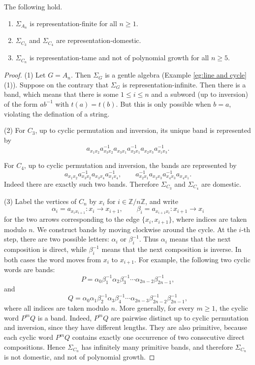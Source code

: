 \documentclass[a4paper,leqno]{amsart}
\begin{document}
\begin{prop}\label{prop:biserial rep type}
The following hold.
\begin{enumerate}
    \item $\Sigma_{A_n}$ is representation-finite for all $n\ge 1$.
    \item $\Sigma_{C_3}$ and $\Sigma_{C_4}$ are representation-domestic.
    \item $\Sigma_{C_n}$ is representation-tame and not of polynomial growth for all $n\geq 5$.
\end{enumerate}
\end{prop}
\begin{proof}
(1) Let $G=A_n$. Then $\Sigma_G$ is a gentle algebra (Example \ref{eg:line and cycle} (1)).  Suppose on the contrary that $\Sigma_G$ is representation-infinite.  Then there is a band, which means that there is some $1\le i\le n$ and a subword (up to inversion) of the form $ab^{-1}$ with $t(a)=t(b)$.  But this is only possible when $b=a$, violating the defination of a string.

(2)  %
For $C_3$, up to cyclic permutation and inversion, its unique band is represented by
$$a_{x_1x_2}a_{x_3x_2}^{-1}a_{x_3x_1}a_{x_2x_1}^{-1}a_{x_2x_3}a_{x_1x_3}^{-1}.$$

For $C_4$, up to cyclic permutation and inversion, the bands are represented by
$$a_{x_1x_2}a_{x_3x_2}^{-1}a_{x_3x_4}a_{x_1x_4}^{-1},\qquad a_{x_2x_1}^{-1}a_{x_2x_3}a_{x_4x_3}^{-1}a_{x_4x_1}.$$
Indeed there are exactly such two bands. Therefore $\Sigma_{C_3}$ and $\Sigma_{C_4}$ are domestic.

(3)  Label the vertices of $C_n$ by $x_i$ for $i\in\mathbb Z/n\mathbb Z$, and write
$$\alpha_i=a_{x_ix_{i+1}}:x_i\to x_{i+1},\qquad\beta_i=a_{x_{i+1}x_i}:x_{i+1}\to x_i$$
for the two arrows corresponding to the edge $\{x_i,x_{i+1}\}$, where indices are taken modulo $n$.
We construct bands by moving clockwise around the cycle. At the $i$-th step, there are two possible letters: $\alpha_i$ or $\beta_i^{-1}$.
Thus $\alpha_i$ means that the next composition is direct, while $\beta_i^{-1}$ means that the next composition is inverse. In both cases the word moves from $x_i$ to $x_{i+1}$. For example, the following two cyclic words are bands:
$$P=\alpha_0\beta_1^{-1}\alpha_2\beta_3^{-1}\cdots \alpha_{2n-2}\beta_{2n-1}^{-1},$$
and
$$Q=\alpha_0\alpha_1\beta_2^{-1}\alpha_3\beta_4^{-1}\cdots
\alpha_{2n-3}\beta_{2n-2}^{-1}\beta_{2n-1}^{-1},$$
where all indices are taken modulo $n$. More generally, for every $m\geq 1$, the cyclic word $P^mQ$ is a band. Indeed, $P^mQ$ are pairwise distinct up to cyclic permutation and inversion, since they have different lengths. They are also primitive, because each cyclic word $P^mQ$ contains exactly one occurrence of two consecutive direct compositions. Hence $\Sigma_{C_n}$ has infinitely many primitive bands, and therefore $\Sigma_{C_n}$ is not domestic, and not of polynomial growth.
\end{proof}
\end{document}
